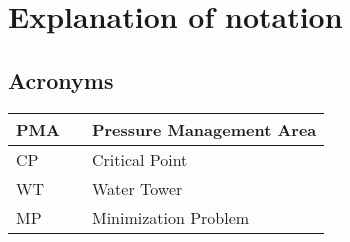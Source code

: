 \chapter{Explanation of notation}

\section*{Acronyms}
\begin{table}
	\begin{tabular}{|l c l|} \hline
		PMA 		&&	Pressure Management Area		\\ \hline
		CP			&&	Critical Point					\\ \hline
		WT			&&	Water Tower						\\ \hline
		MP		  	&&	Minimization Problem			\\ \hline
	\end{tabular}
\end{table}
